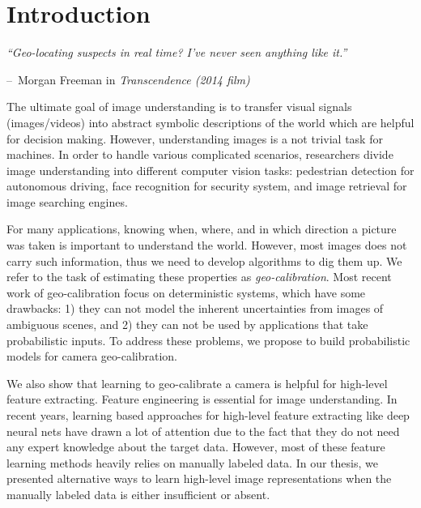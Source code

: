\chapter{Introduction}
\label{chap:intro}

\makeatletter
\newenvironment{chapquote}[2][2em]
{\setlength{\@tempdima}{#1} \def\chapquote@author{#2} \parshape 1
  \@tempdima \dimexpr\textwidth-2\@tempdima\relax \itshape}
{\par\normalfont\hfill--\
\chapquote@author\hspace*{\@tempdima}\par\bigskip}
\makeatother

\begin{chapquote}{Morgan Freeman in {\em Transcendence (2014 film)}
\\ \todo{don't laugh.}}
  ``Geo-locating suspects in real time? I've never seen anything like
it.''
\end{chapquote}

The ultimate goal of image understanding is to transfer visual
signals (images/videos) into abstract symbolic descriptions of the
world which are helpful for decision making.
However, understanding images is a not trivial task for machines.
In order to handle various complicated scenarios, researchers divide
image understanding into different computer vision tasks: pedestrian
detection for autonomous driving, face recognition for security
system, and image retrieval for image searching engines.

For many applications, knowing when, where, and in which direction a
picture was taken is important to understand the world. However, most
images does not carry such information, thus we need to develop
algorithms to dig them up.  We refer to the task of estimating these
properties as {\em geo-calibration}.
Most recent work of geo-calibration focus on deterministic systems, 
which have some drawbacks: 1) they can not model the inherent
uncertainties from images of ambiguous scenes, and 2) they can not be
used by applications that take probabilistic inputs. To address
these problems, we propose to build probabilistic models for camera
geo-calibration.

We also show that learning to geo-calibrate a camera is helpful for
high-level feature extracting. Feature engineering is essential for
image understanding. In recent years, learning based approaches for
high-level feature extracting like deep neural nets have drawn a lot
of attention due to the fact that they do not need any expert
knowledge about the target data. However, most of these feature
learning methods heavily relies on manually labeled data. In our
thesis, we presented alternative ways to learn high-level image
representations when the manually labeled data is either insufficient
or absent.

